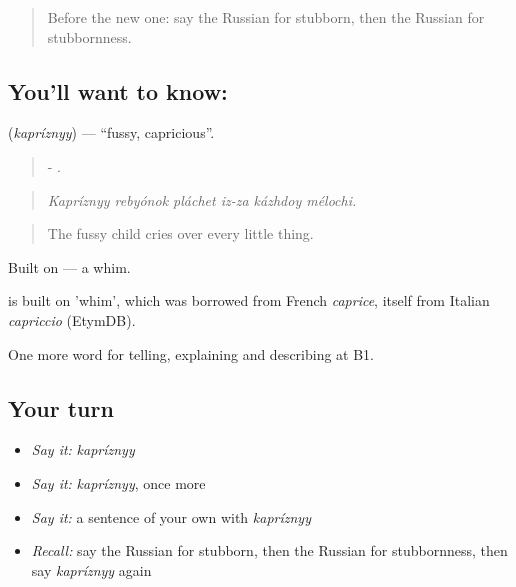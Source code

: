 \begin{quote}
Before the new one: say the Russian for stubborn, then the Russian for stubbornness.
\end{quote}

\subsection*{You'll want to know: }
\textbf{} (\emph{kapríznyy}) — \textquotedblleft{}fussy, capricious\textquotedblright{}.

\begin{quote}
   -  .
\end{quote}

\begin{quote}
\emph{Kapríznyy rebyónok pláchet iz-za kázhdoy mélochi.}
\end{quote}

\begin{quote}
The fussy child cries over every little thing.
\end{quote}

Built on \emph{} — a whim.

\begin{cousinweb}
\emph{} is built on \emph{} 'whim', which was borrowed from French \emph{caprice}, itself from Italian \emph{capriccio} (EtymDB).
\end{cousinweb}

\begin{grammarlens}[title={What you've built}]
One more word for telling, explaining and describing at B1.
\end{grammarlens}

\subsection*{Your turn}
\begin{itemize}
\raggedright
  \item \emph{Say it:} \emph{kapríznyy}
  \item \emph{Say it:} \emph{kapríznyy}, once more
  \item \emph{Say it:} a sentence of your own with \emph{kapríznyy}
  \item \emph{Recall:} say the Russian for stubborn, then the Russian for stubbornness, then say \emph{kapríznyy} again
\end{itemize}

